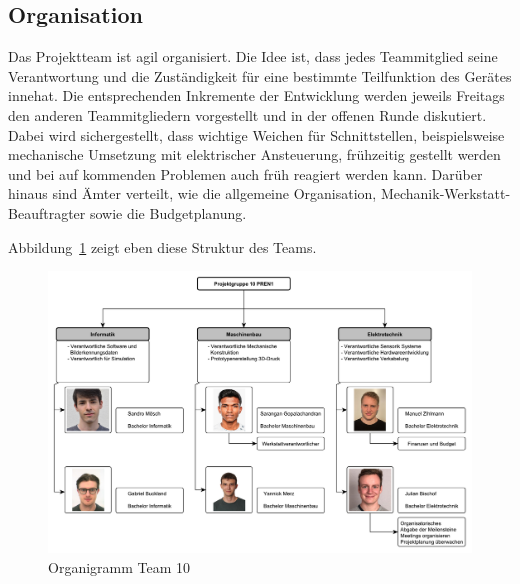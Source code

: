 \documentclass[main.tex]{subfiles} %
\begin{document}

\subsection{Organisation}

Das Projektteam ist agil organisiert. Die Idee ist, dass jedes Teammitglied
seine Verantwortung und die Zuständigkeit für eine bestimmte Teilfunktion des
Gerätes innehat. Die entsprechenden Inkremente der Entwicklung werden jeweils
Freitags den anderen Teammitgliedern vorgestellt und in der offenen Runde
diskutiert. Dabei wird sichergestellt, dass wichtige Weichen für
Schnittstellen, beispielsweise mechanische Umsetzung mit elektrischer
Ansteuerung, frühzeitig gestellt werden und bei auf kommenden Problemen auch
früh reagiert werden kann. Darüber hinaus sind Ämter verteilt, wie die
allgemeine Organisation, Mechanik-Werkstatt-Beauftragter sowie die
Budgetplanung.

Abbildung~\ref{fig:Organigramm} zeigt eben diese Struktur des Teams.

\begin{figure}[H]
    \centering
    \includegraphics[page=1, width=1\textwidth]{./fig_Projektmanagement/Organigramm.pdf}
    \caption{Organigramm Team 10}\label{fig:Organigramm}
\end{figure}
\end{document}
